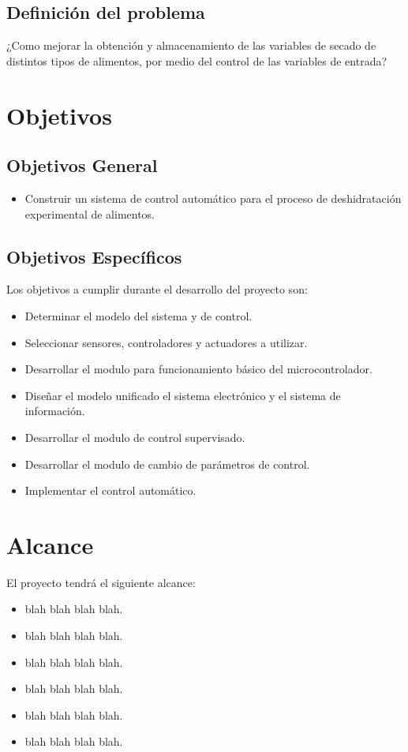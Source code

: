 \subsection{Definición del problema}

¿Como mejorar la obtención y almacenamiento de las variables de secado de
distintos tipos de alimentos, por medio del control de las variables de entrada?


\section{Objetivos}

\subsection{Objetivos General}
\begin{itemize}
  \item Construir un sistema de control automático para el proceso de
        deshidratación experimental de alimentos.

\end{itemize}

\subsection{Objetivos Específicos}
Los objetivos a cumplir durante el desarrollo del proyecto son:
\begin{itemize}
  \item Determinar el modelo del sistema y de control.
  \item Seleccionar sensores, controladores y actuadores a utilizar.
  \item Desarrollar el modulo para funcionamiento básico del microcontrolador.
  \item Diseñar el modelo unificado el sistema electrónico y el sistema de información.
  \item Desarrollar el modulo de control supervisado.
  \item Desarrollar el modulo de cambio de parámetros de control.
  \item Implementar el control automático.
\end{itemize}

\section{Alcance}
El proyecto tendrá el siguiente alcance:
\begin{itemize}
  \item blah blah blah blah.
  \item blah blah blah blah.
  \item blah blah blah blah.
  \item blah blah blah blah.
  \item blah blah blah blah.
  \item blah blah blah blah.
\end{itemize}


